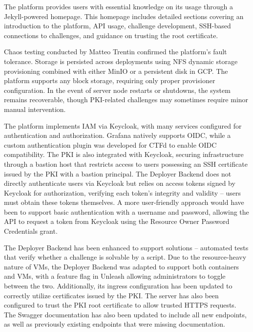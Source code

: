 The platform provides users with essential knowledge on its usage through a Jekyll-powered homepage. This homepage includes detailed sections covering an introduction to the platform, API usage, challenge development, SSH-based connections to challenges, and guidance on trusting the root certificate.

Chaos testing conducted by Matteo Trentin confirmed the platform's fault tolerance. Storage is persisted across deployments using NFS dynamic storage provisioning combined with either MinIO or a persistent disk in GCP. The platform supports any block storage, requiring only proper provisioner configuration. In the event of server node restarts or shutdowns, the system remains recoverable, though PKI-related challenges may sometimes require minor manual intervention.

The platform implements IAM via Keycloak, with many services configured for authentication and authorization. Grafana natively supports OIDC, while a custom authentication plugin was developed for CTFd to enable OIDC compatibility. The PKI is also integrated with Keycloak, securing infrastructure through a bastion host that restricts access to users possessing an SSH certificate issued by the PKI with a bastion principal. The Deployer Backend does not directly authenticate users via Keycloak but relies on access tokens signed by Keycloak for authorization, verifying each token's integrity and validity -- users must obtain these tokens themselves. A more user-friendly approach would have been to support basic authentication with a username and password, allowing the API to request a token from Keycloak using the Resource Owner Password Credentials grant.

The Deployer Backend has been enhanced to support solutions -- automated tests that verify whether a challenge is solvable by a script. Due to the resource-heavy nature of VMs, the Deployer Backend was adapted to support both containers and VMs, with a feature flag in Unleash allowing administrators to toggle between the two. Additionally, its ingress configuration has been updated to correctly utilize certificates issued by the PKI. The server has also been configured to trust the PKI root certificate to allow trusted HTTPS requests. The Swagger documentation has also been updated to include all new endpoints, as well as previously existing endpoints that were missing documentation.

